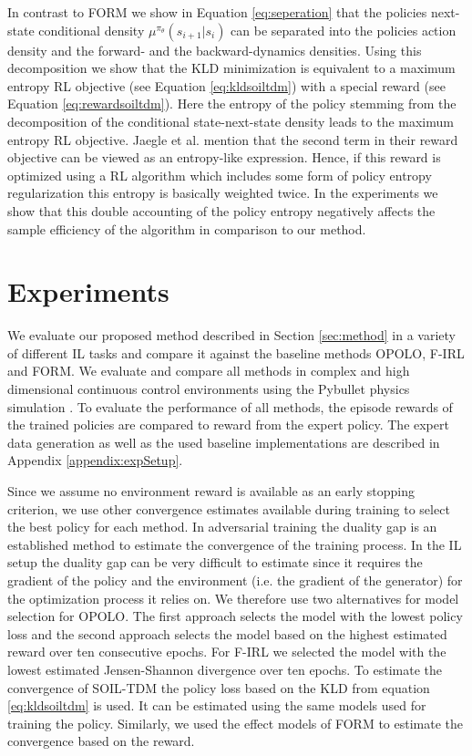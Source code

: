 \documentclass{article}
\begin{document}
In contrast to FORM we show in Equation \ref{eq:seperation} that the policies next-state conditional density $\mu^{\pi_{\theta}}(s_{i+1}|s_{i})$ can be separated into the policies action density and the forward- and the backward-dynamics densities. Using this decomposition we show that the KLD minimization is equivalent to a maximum entropy RL objective (see Equation \ref{eq:kldsoiltdm}) with a special reward (see Equation \ref{eq:rewardsoiltdm}). Here the entropy of the policy stemming from the decomposition of the conditional state-next-state density leads to the maximum entropy RL objective. Jaegle et al.  mention that the second term in their reward objective can be viewed as an entropy-like expression. Hence, if this reward is optimized using a RL algorithm which includes some form of policy entropy regularization this entropy is basically weighted twice. In the experiments we show that this double accounting of the policy entropy negatively affects the sample efficiency of the algorithm in comparison to our method.


\section{Experiments}
We evaluate our proposed method described in Section \ref{sec:method} in a variety of different IL tasks and compare it against the baseline methods OPOLO, F-IRL and FORM. We evaluate and compare all methods in complex and high dimensional continuous control environments using the Pybullet physics simulation \cite{coumans2019}. To evaluate the performance of all methods, the episode rewards of the trained policies are compared to reward from the expert policy. The expert data generation as well as the used baseline implementations are described in Appendix \ref{appendix:expSetup}. 

Since we assume no environment reward is available as an early stopping criterion, we use other convergence estimates available during training to select the best policy for each method. In adversarial training the duality gap \cite{grnarova2019a,Sidheekh2021OnDG} is an established method to estimate the convergence of the training process. In the IL setup the duality gap can be very difficult to estimate since it requires the gradient of the policy and the environment (i.e. the gradient of the generator) for the optimization process it relies on. We therefore use two alternatives for model selection for OPOLO. The first approach selects the model with the lowest policy loss and the second approach selects the model based on the highest estimated reward over ten consecutive epochs. For F-IRL we selected the model with the lowest estimated Jensen-Shannon divergence over ten epochs. 
To estimate the convergence of SOIL-TDM the policy loss based on the KLD from equation \ref{eq:kldsoiltdm} is used. It can be estimated using the same models used for training the policy. Similarly, we used the effect models of FORM to estimate the convergence based on the reward. 
\end{document}
